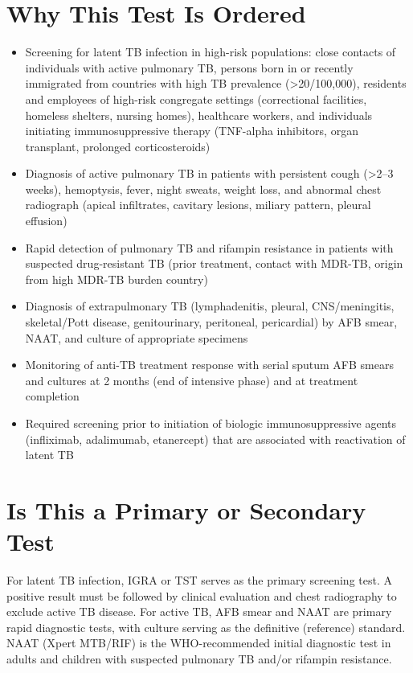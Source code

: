\section*{Why This Test Is Ordered}
\begin{itemize}
  \item Screening for latent TB infection in high-risk populations: close contacts of individuals with active pulmonary TB, persons born in or recently immigrated from countries with high TB prevalence (>20/100,000), residents and employees of high-risk congregate settings (correctional facilities, homeless shelters, nursing homes), healthcare workers, and individuals initiating immunosuppressive therapy (TNF-alpha inhibitors, organ transplant, prolonged corticosteroids)
  \item Diagnosis of active pulmonary TB in patients with persistent cough (>2--3 weeks), hemoptysis, fever, night sweats, weight loss, and abnormal chest radiograph (apical infiltrates, cavitary lesions, miliary pattern, pleural effusion)
  \item Rapid detection of pulmonary TB and rifampin resistance in patients with suspected drug-resistant TB (prior treatment, contact with MDR-TB, origin from high MDR-TB burden country)
  \item Diagnosis of extrapulmonary TB (lymphadenitis, pleural, CNS/meningitis, skeletal/Pott disease, genitourinary, peritoneal, pericardial) by AFB smear, NAAT, and culture of appropriate specimens
  \item Monitoring of anti-TB treatment response with serial sputum AFB smears and cultures at 2 months (end of intensive phase) and at treatment completion
  \item Required screening prior to initiation of biologic immunosuppressive agents (infliximab, adalimumab, etanercept) that are associated with reactivation of latent TB
\end{itemize}

\section*{Is This a Primary or Secondary Test}
For latent TB infection, IGRA or TST serves as the primary screening test. A positive result must be followed by clinical evaluation and chest radiography to exclude active TB disease. For active TB, AFB smear and NAAT are primary rapid diagnostic tests, with culture serving as the definitive (reference) standard. NAAT (Xpert MTB/RIF) is the WHO-recommended initial diagnostic test in adults and children with suspected pulmonary TB and/or rifampin resistance.

